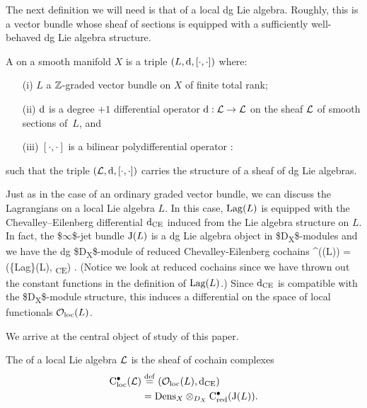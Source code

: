 \documentclass[11pt]{article}
\begin{document}
The next definition we will need is that of a local dg Lie algebra.
Roughly, this is a vector bundle whose sheaf of sections is equipped with a sufficiently well-behaved dg Lie algebra structure.

\begin{dfn}
A  on a smooth manifold $X$ is a triple $(L, {\rm d}, [\cdot , \cdot])$ where:
\begin{itemize}
\item[(i)] $L$ a $\mathbb Z$-graded vector bundle on $X$ of finite total rank;
\item[(ii)] ${\rm d}$ is a degree $+1$ differential operator ${\rm d} : \mathcal L \to \mathcal L$ on the sheaf $\mathcal L$ of smooth sections of~$L$, and
\item[(iii)] $[\cdot, \cdot]$ is a bilinear polydifferential operator
\beqn
[\cdot , \cdot] : \cL \times \cL \to \cL
\eeqn
\end{itemize}
such that the triple $(\mathcal L, {\rm d}, [\cdot,\cdot])$ carries the structure of a sheaf of dg Lie algebras.
\end{dfn}

Just as in the case of an ordinary graded vector bundle, we can discuss the Lagrangians on a local Lie algebra \(L\).
In this case, \({\rm Lag}(L)\) is equipped with the Chevalley--Eilenberg differential \({\rm d}_{\rm CE}\) induced from the Lie algebra structure on \(L\).
In fact, the \$\(\infty\)\$-jet bundle \({\rm J}(L)\) is a dg Lie algebra object in \$D\textsubscript{X}\$-modules and we have the dg \$D\textsubscript{X}\$-module of reduced Chevalley-Eilenberg cochains
\beqn
\cred\^{}\bu (\jet(L)) = (\{\rm Lag\}(L), \d\textsubscript{\rm CE}) .
\eeqn
(Notice we look at reduced cochains since we have thrown out the constant functions in the definition of \({\rm Lag}(L)\).)
Since \({\rm d}_{\rm CE}\) is compatible with the \$D\textsubscript{X}\$-module structure, this induces a differential on the space of local functionals \({\mathcal O}_{\rm loc}(L)\).

We arrive at the central object of study of this paper.

\begin{dfn}
The  of a local Lie algebra $\mathcal L$ is the sheaf of cochain complexes
\begin{align}
{\rm C}_{\rm loc}^\bullet(\mathcal L) & \overset{\rm def}{=} \left({\mathcal O}_{\rm loc}(L) , {\rm d}_{\rm CE} \right) \\ & = {\rm Dens}_X \otimes_{D_X} {\rm C}_{\rm red}^\bullet({\rm J}(L)).
\end{align}
\end{dfn}
\end{document}
